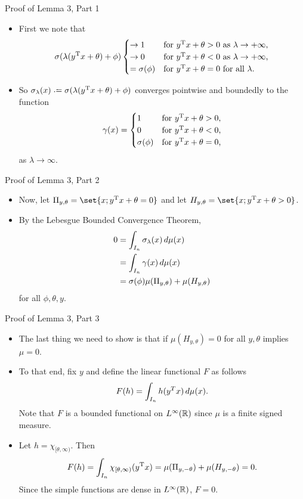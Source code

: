 \documentclass[11pt,letterpaper]{beamer}
\begin{document}
\begin{frame}{Proof of Lemma 3, Part 1}
  \begin{itemize}
  \item First we note that
    \[
      \sigma(\lambda( y^{\mathrm{T}} x+\theta)+\phi)
      \begin{cases}
        \to 1&\text{for $ y^{\mathrm{T}} x+\theta>0$ as $\lambda\to+\infty$,}\\
        \to 0&\text{for $ y^{\mathrm{T}} x+\theta<0$ as $\lambda\to+\infty$,}\\
        =\sigma(\phi)&\text{for $ y^{\mathrm{T}} x+\theta=0$ for all $\lambda$.}
      \end{cases}
    \]
  \item So $\sigma_\lambda( x)\bdef\sigma(\lambda( y^\rmT x+\theta)+\phi)$
    converges pointwise and boundedly to the function
    \[
      \gamma( x)=\begin{cases}
        1&\text{for $ y^{\mathrm{T}} x+\theta>0$,}\\
        0&\text{for $ y^{\mathrm{T}} x+\theta<0$,}\\
        \sigma(\phi)&\text{for $ y^{\mathrm{T}} x+\theta=0$,}
      \end{cases}
    \]
    as $\lambda\to\infty$.
\end{itemize}
\end{frame}

\begin{frame}{Proof of Lemma 3, Part 2}
  \begin{itemize}
  \item Now, let $\Pi_{ y,\theta}=\set{ x; y^\rmT x+\theta=0}$ and let $H_{
      y,\theta}=\set{ x; y^\rmT x+\theta>0}$.
  \item By the Lebesgue Bounded Convergence Theorem,
    \begin{align*}
      0&=\int_{I_n}\sigma_\lambda( x)\mathop{}\!d\mu( x)\\
       &=\int_{I_n}\gamma( x)\mathop{}\!d\mu( x)\\
       &=\sigma(\phi)\mu(\Pi_{ y,\theta})+\mu(H_{ y,\theta})
    \end{align*}
    for all $\phi,\theta, y$.
  \end{itemize}
\end{frame}

\begin{frame}{Proof of Lemma 3, Part 3}
  \begin{itemize}
  \item The last thing we need to show is that if $\mu(H_{ y,\theta})=0$ for all
    $ y,\theta$ implies $\mu=0$.
  \item To that end, fix $ y$ and define the linear functional $F$ as follows
    \[
      F(h)=\int_{I_n} h( y^T x)\mathop{}\!d\mu( x).
    \]
    Note that $F$ is a bounded functional on $L^\infty(\mathbb{R})$ since $\mu$ is a
    finite signed measure.
  \item Let $h=\chi_{[\theta,\infty)}$. Then
    \[
      F(h)=\int_{I_n}\chi_{[\theta,\infty)}( y^{\mathrm{T}} x)= \mu(\Pi_{
        y,-\theta})+\mu(H_{ y,-\theta})=0.
    \]
    Since the simple functions are dense in $L^\infty(\mathbb{R})$, $F=0$.
\end{itemize}
\end{frame}
\end{document}
